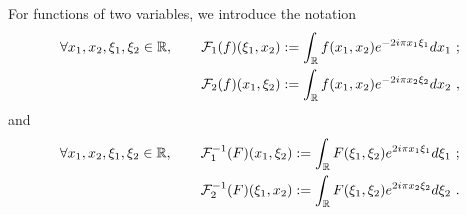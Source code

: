 For functions of two variables, we introduce the notation
\begin{align}
   \forall x_1,x_2,\xi_1,\xi_2\in\R, \qquad \F_1 (f)(\xi_1,x_2)&:= \int_\R f(x_1,x_2)e^{-2i\pi x_1\xi_1}dx_1 \ ; \\
   \F_2 (f)(x_1,\xi_2)&:= \int_\R f(x_1,x_2)e^{-2i\pi x_2\xi_2}dx_2\ ,
\end{align}
and
\begin{align}
    \forall  x_1,x_2,\xi_1,\xi_2\in\mathbb{R}, \qquad \mathcal{F}^{-1}_1 (F)(x_1,\xi_2)&:= \int_{\mathbb{R}} F(\xi_1,\xi_2)e^{2i\pi x_1\xi_1}d\xi_1 \ ; \\
    \mathcal{F}^{-1}_2 (F)(\xi_1,x_2) & := \int_{\mathbb{R}} F(\xi_1,\xi_2)e^{2i\pi x_2\xi_2}d\xi_2\ .
\end{align}
